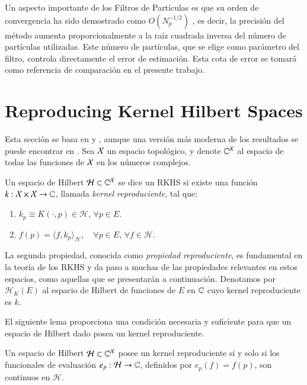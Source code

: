 Un aspecto importante de los Filtros de Partículas es que su orden de convergencia ha sido demostrado como $O(N_p^{-1/2})$ \cite{Crisan2002APractitioners, Chopin2020AnCarlo}, es decir, la precisión del método aumenta proporcionalmente a la raíz cuadrada inversa del número de partículas utilizadas. Este número de partículas, que se elige como parámetro del filtro, controla directamente el error de estimación. Esta cota de error se tomará como referencia de comparación en el presente trabajo.

\section{Reproducing Kernel Hilbert Spaces}
Esta sección se basa en \cite{Wendland2004ScatteredApproximation} y \cite{Berlinet2004ReproducingStatistics}, aunque una versión más moderna de los resultados se puede encontrar en \cite{Saitoh2016TheoryApplications}. Sea \( \mathcal{X} \) un espacio topológico, y denote \(\mathbb{C}^{\mathcal{X}}\) al espacio de todas las funciones de \( \mathcal{X} \) en los números complejos. 

\begin{defn}  
Un espacio de Hilbert \( \mathcal{H} \subset \mathbb{C}^{\mathcal{X}} \) se dice un RKHS si existe una función \( k: \mathcal{X} \times \mathcal{X} \to \mathbb{C} \), llamada \textit{kernel reproduciente}, tal que:
\begin{enumerate}
    \item \( k_p \equiv K(\cdot, p) \in \mathcal{H}, \, \forall p \in E \).
    \item \( f(p) = \langle f, k_p \rangle_{\mathcal{H}}, \quad \forall p \in E, \, \forall f \in \mathcal{H}. \)
\end{enumerate}
\end{defn}

\noindent La segunda propiedad, conocida como \textit{propiedad reproduciente}, es fundamental en la teoría de los RKHS y da paso a muchas de las propiedades relevantes en estos espacios, como aquellas que se presentarán a continuación. Denotamos por \( \mathcal{H}_K(E) \) al espacio de Hilbert de funciones de \( E \) en \( \mathbb{C} \) cuyo kernel reproduciente es \( k \).

El siguiente lema proporciona una condición necesaria y suficiente para que un espacio de Hilbert dado posea un kernel reproduciente.

\begin{lema}
Un espacio de Hilbert \( \mathcal{H} \subset \mathbb{C}^{\mathcal{X}} \) posee un kernel reproduciente si y solo si los funcionales de evaluación \( e_p: \mathcal{H} \to \mathbb{C} \), definidos por \( e_p(f) = f(p) \), son continuos en \( \mathcal{H} \).
\end{lema}

